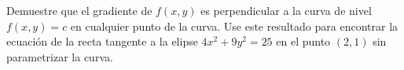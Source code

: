 Demuestre que el gradiente de $f(x, y)$ es perpendicular a la curva de nivel $f(x, y) = c$ en cualquier punto de la curva. Use este resultado para encontrar la ecuación de la recta tangente a la elipse $4x^2 + 9y^2 = 25$ en el punto $(2, 1)$ sin parametrizar la curva.
